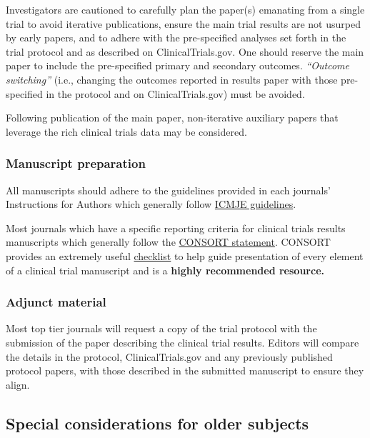\documentclass[]{book}
\theoremstyle{definition}
\theoremstyle{definition}
\theoremstyle{definition}
\theoremstyle{remark}
\begin{document}
Investigators are cautioned to carefully plan the paper(s) emanating
from a single trial to avoid iterative publications, ensure the main
trial results are not usurped by early papers, and to adhere with the
pre-specified analyses set forth in the trial protocol and as described
on ClinicalTrials.gov. One should reserve the main paper to include the
pre-specified primary and secondary outcomes. \emph{``Outcome
switching''} (i.e., changing the outcomes reported in results paper with
those pre-specified in the protocol and on ClinicalTrials.gov) must be
avoided.

Following publication of the main paper, non-iterative auxiliary papers
that leverage the rich clinical trials data may be considered.

\subsubsection{Manuscript preparation}\label{manuscript-preparation}

All manuscripts should adhere to the guidelines provided in each
journals' Instructions for Authors which generally follow
\href{http://www.icmje.org/recommendations/browse/manuscript-preparation/preparing-for-submission.html}{ICMJE
guidelines}.

Most journals which have a specific reporting criteria for clinical
trials results manuscripts which generally follow the
\href{http://www.consort-statement.org/}{CONSORT statement}. CONSORT
provides an extremely useful
\href{http://www.consort-statement.org/checklists/view/32-consort/66-title}{checklist}
to help guide presentation of every element of a clinical trial
manuscript and is a \textbf{highly recommended resource.}

\subsubsection{Adjunct material}\label{adjunct-material}

Most top tier journals will request a copy of the trial protocol with
the submission of the paper describing the clinical trial results.
Editors will compare the details in the protocol, ClinicalTrials.gov and
any previously published protocol papers, with those described in the
submitted manuscript to ensure they align.

\subsection{Special considerations for older
subjects}\label{special-considerations-for-older-subjects-15}
\end{document}
